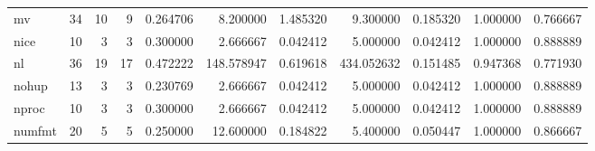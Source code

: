 \begin{tabular}{lrrrrrrrrrr}
mv        &                                      34 &                 10 &                                 9 &                                   0.264706 &                               8.200000 &                                     1.485320 &                          9.300000 &                                0.185320 &                           1.000000 &                                           0.766667 \\
nice      &                                      10 &                  3 &                                 3 &                                   0.300000 &                               2.666667 &                                     0.042412 &                          5.000000 &                                0.042412 &                           1.000000 &                                           0.888889 \\
nl        &                                      36 &                 19 &                                17 &                                   0.472222 &                             148.578947 &                                     0.619618 &                        434.052632 &                                0.151485 &                           0.947368 &                                           0.771930 \\
nohup     &                                      13 &                  3 &                                 3 &                                   0.230769 &                               2.666667 &                                     0.042412 &                          5.000000 &                                0.042412 &                           1.000000 &                                           0.888889 \\
nproc     &                                      10 &                  3 &                                 3 &                                   0.300000 &                               2.666667 &                                     0.042412 &                          5.000000 &                                0.042412 &                           1.000000 &                                           0.888889 \\
numfmt    &                                      20 &                  5 &                                 5 &                                   0.250000 &                              12.600000 &                                     0.184822 &                          5.400000 &                                0.050447 &                           1.000000 &                                           0.866667 \\

\end{tabular}
